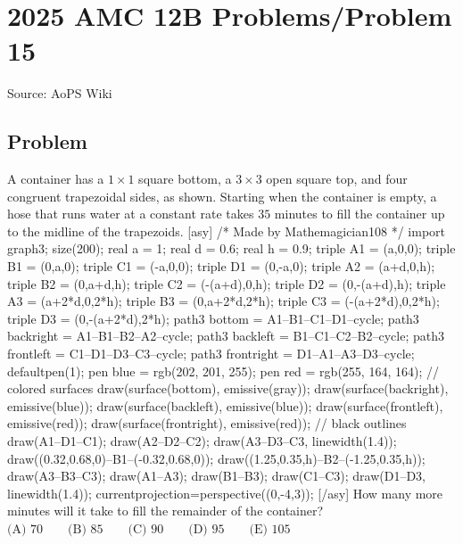 \documentclass[12pt]{article}
\begin{document}
\section*{{2025 AMC 12B Problems/Problem 15}}
Source: AoPS Wiki

\subsection*{Problem}
A container has a $1\times 1$ square bottom, a $3\times 3$ open square top, and four congruent trapezoidal sides, as shown. Starting when the container is empty, a hose that runs water at a constant rate takes $35$ minutes to fill the container up to the midline of the trapezoids. [asy] /* Made by Mathemagician108 */ import graph3; size(200); real a = 1; real d = 0.6; real h = 0.9; triple A1 = (a,0,0); triple B1 = (0,a,0); triple C1 = (-a,0,0); triple D1 = (0,-a,0); triple A2 = (a+d,0,h); triple B2 = (0,a+d,h); triple C2 = (-(a+d),0,h); triple D2 = (0,-(a+d),h); triple A3 = (a+2*d,0,2*h); triple B3 = (0,a+2*d,2*h); triple C3 = (-(a+2*d),0,2*h); triple D3 = (0,-(a+2*d),2*h); path3 bottom = A1--B1--C1--D1--cycle; path3 backright = A1--B1--B2--A2--cycle; path3 backleft = B1--C1--C2--B2--cycle; path3 frontleft = C1--D1--D3--C3--cycle; path3 frontright = D1--A1--A3--D3--cycle; defaultpen(1); pen blue = rgb(202, 201, 255); pen red = rgb(255, 164, 164); // colored surfaces draw(surface(bottom), emissive(gray)); draw(surface(backright), emissive(blue)); draw(surface(backleft), emissive(blue)); draw(surface(frontleft), emissive(red)); draw(surface(frontright), emissive(red)); // black outlines draw(A1--D1--C1); draw(A2--D2--C2); draw(A3--D3--C3, linewidth(1.4)); draw((0.32,0.68,0)--B1--(-0.32,0.68,0)); draw((1.25,0.35,h)--B2--(-1.25,0.35,h)); draw(A3--B3--C3); draw(A1--A3); draw(B1--B3); draw(C1--C3); draw(D1--D3, linewidth(1.4)); currentprojection=perspective((0,-4,3)); [/asy] How many more minutes will it take to fill the remainder of the container? $\text{(A) }70 \qquad \text{(B) }85 \qquad \text{(C) }90 \qquad \text{(D) }95 \qquad \text{(E) }105$
\end{document}
